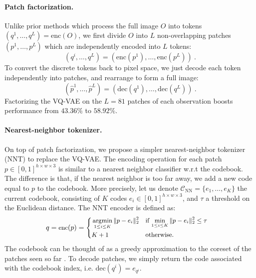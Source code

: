\paragraph{Patch factorization.}
Unlike prior methods which process the full image $O$ into tokens $(q^1,\ldots,q^L) = \text{enc}(O)$, we first divide $O$ into $L$ non-overlapping patches
$(p^1, \ldots, p^L)$ which are independently encoded into $L$ tokens:
\begin{equation*}
    (q^i,\ldots, q^L) = (\text{enc}(p^1), \ldots, \text{enc}(p^L))
    ~.
\end{equation*}
To convert the discrete tokens back to pixel
space, we just decode each token independently into patches, and rearrange to form a full image:
\begin{equation*}
    (\hat{p}^1, \ldots, \hat{p}^L) = 
    (\text{dec}(q^1), \ldots, \text{dec}(q^L))
    ~.
\end{equation*}
Factorizing the VQ-VAE on the $L=81$ patches of each observation boosts performance from $43.36\%$ to $58.92\%$.

\paragraph{Nearest-neighbor tokenizer.}
On top of patch factorization, we propose a simpler nearest-neighbor tokenizer (NNT) to replace the VQ-VAE.
The encoding operation for each patch $p \in [0, 1]^{h\times w\times3}$
is similar to a nearest neighbor classifier w.r.t the codebook.
The difference is that, if the nearest neighbor
is too far away, 
we add a new code equal to $p$ to the codebook.
More precisely, let us denote  $\mathcal{C}_{\text{NN}}=\{e_1, \ldots,e_K\}$ the current codebook,
consisting of $K$ codes $e_i \in [0, 1]^{h\times w\times3}$, 
and $\tau$ a threshold on the Euclidean distance. 
The NNT encoder is defined as:
\begin{equation}
    \small
    q = \text{enc}(p) = 
    \begin{cases}
    \begin{alignedat}{2}
        &\operatorname*{argmin}_{1\le i \le K} \| p -  e_i\|_2^2 &&\quad\text{if $\min_{1\le i \le K} \| p - e_{i} \|_2^2 \le \tau$} \\
        &K+1 &&\quad\text{otherwise.}
    \end{alignedat}
    \end{cases}
    \label{eqn:opt}
\end{equation}
The codebook can be thought of as a
greedy approximation to the coreset of 
the patches seen so far
\citep{Mirzasoleiman2020}. 
To decode patches, we simply return the code associated with the codebook index, i.e. $\text{dec}(q^i)=e_{q^i}$.

